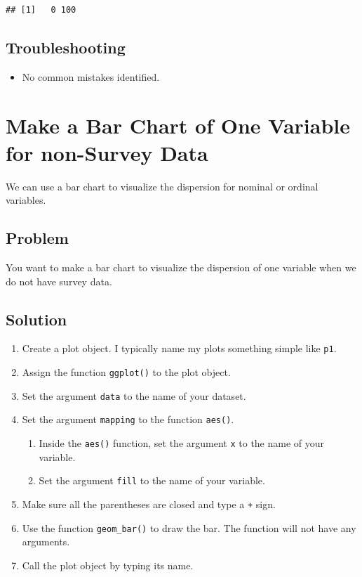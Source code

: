 \documentclass[
]{book}
\providecommand{\tightlist}{%
  \setlength{\itemsep}{0pt}\setlength{\parskip}{0pt}}
\begin{document}
\begin{verbatim}
## [1]   0 100
\end{verbatim}

\hypertarget{troubleshooting-31}{%
\subsection{Troubleshooting}\label{troubleshooting-31}}

\begin{itemize}
\tightlist
\item
  No common mistakes identified.
\end{itemize}

\hypertarget{barchart_nosurv}{%
\section{Make a Bar Chart of One Variable for non-Survey Data}\label{barchart_nosurv}}

We can use a bar chart to visualize the dispersion for nominal or ordinal variables.

\hypertarget{problem-36}{%
\subsection{Problem}\label{problem-36}}

You want to make a bar chart to visualize the dispersion of one variable when we do not have survey data.

\hypertarget{solution-35}{%
\subsection{Solution}\label{solution-35}}

\begin{enumerate}
\def\labelenumi{\arabic{enumi}.}
\tightlist
\item
  Create a plot object. I typically name my plots something simple like \texttt{p1}.
\item
  Assign the function \texttt{ggplot()} to the plot object.
\item
  Set the argument \texttt{data} to the name of your dataset.
\item
  Set the argument \texttt{mapping} to the function \texttt{aes()}.

  \begin{enumerate}
  \def\labelenumii{\alph{enumii}.}
  \tightlist
  \item
    Inside the \texttt{aes()} function, set the argument \texttt{x} to the name of your variable.
  \item
    Set the argument \texttt{fill} to the name of your variable.
  \end{enumerate}
\item
  Make sure all the parentheses are closed and type a \texttt{+} sign.
\item
  Use the function \texttt{geom\_bar()} to draw the bar. The function will not have any arguments.
\item
  Call the plot object by typing its name.
\end{enumerate}
\end{document}

